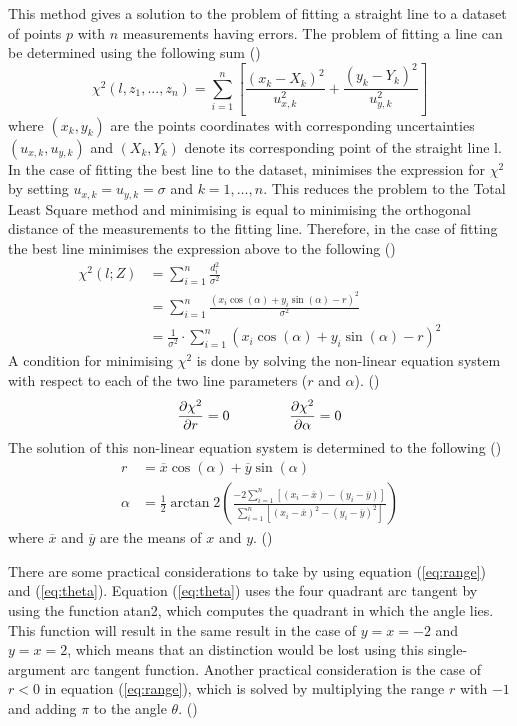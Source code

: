 \documentclass[../Head/Main.tex]{subfiles}
\begin{document}
\clearpage 
This method gives a solution to the problem of fitting a straight line to a dataset of points $p$ with $n$ measurements having errors. The problem of fitting a line can be determined using the following sum (\cite[1-3]{TLSM})
\begin{equation}
    \chi^2\left(l, z_1, ..., z_n\right) = \sum_{i = 1}^{n} \left[\frac{\left(x_k - X_k\right)^2}{u_{x, k}^{2}} + \frac{\left(y_k - Y_k\right)^2}{u_{y, k}^{2}}\right]
\end{equation}
where $(x_k,y_k)$ are the points coordinates with corresponding uncertainties $(u_{x, k},u_{y, k})$ and $(X_k,Y_k)$ denote its corresponding point of the straight line l. In the case of fitting the best line to the dataset, minimises the expression for $\chi^2$ by setting $u_{x, k}=u_{y, k}=\sigma$ and $k=1,…,n$. This reduces the problem to the Total Least Square method and minimising is equal to minimising the orthogonal distance of the measurements to the fitting line. Therefore, in the case  of fitting the best line minimises the expression above to the following (\cite[1-3]{TLSM})
\begin{align}
    \chi^2\left(l; Z\right) &= \sum_{i = 1}^{n} \frac{d_i^2}{\sigma^2} \\
    &= \sum_{i = 1}^{n}\frac{\left(x_i\cos(\alpha) + y_i\sin⁡(\alpha)-r\right)^2}{\sigma^2}\\
    &= \frac{1}{\sigma^2}\cdot\sum_{i = 1}^{n}\left(x_i\cos(\alpha) + y_i\sin⁡(\alpha)-r\right)^2
\end{align}
A condition for minimising $\chi^2$ is done by solving the non-linear equation system with respect to each of the two line parameters ($r$ and $\alpha$). (\cite[1-3]{TLSM})
\begin{align}
    \frac{\partial\chi^2}{\partial r} = 0 \hspace{1.5cm} \frac{\partial\chi^2}{\partial\alpha} = 0
\end{align}
The solution of this non-linear equation system is determined to the following (\cite[1-3]{TLSM})
\begin{align}
	r &= \overline{x}\cos(\alpha)+\overline{y}\sin(\alpha) \label{eq:range} \\
    \alpha &= \frac{1}{2}\arctan2\left(\frac{-2\sum_{i=1}^{n}\left[\left(x_i-\overline{x}\right) - \left(y_i-\overline{y}\right)\right]}{\sum_{i = 1}^{n}\left[\left(x_i-\overline{x}\right)^2 - \left(y_i-\overline{y}\right)^2\right]}\right) \label{eq:theta}
\end{align}
where $\overline{x}$ and $\overline{y}$ are the means of $x$ and $y$. (\cite[1-3]{TLSM}) \par
There are some practical considerations to take by using equation (\ref{eq:range}) and (\ref{eq:theta}). Equation (\ref{eq:theta}) uses the four quadrant arc tangent by using the function atan2, which computes the quadrant in which the angle lies. This function will result in the same result in the case of $y  = x = -2$ and $y = x = 2$, which means that an distinction would be lost using this single-argument arc tangent function. Another practical consideration is the case of $r < 0$ in equation (\ref{eq:range}), which is solved by multiplying the range $r$ with $-1$ and adding $\pi$ to the angle $\theta$. (\cite[1-3]{TLSM})
\end{document}
